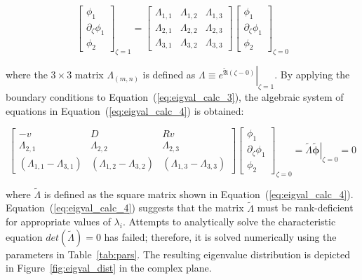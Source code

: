 \begin{equation} \label{eq:eigval_calc_3}
    \begin{bmatrix}
        \phi_1 \\ \partial_\zeta \phi_1 \\ \phi_2
    \end{bmatrix}_{\zeta=1} = \begin{bmatrix}
        \Lambda_{1,1} & \Lambda_{1,2} & \Lambda_{1,3} \\
        \Lambda_{2,1} & \Lambda_{2,2} & \Lambda_{2,3} \\
        \Lambda_{3,1} & \Lambda_{3,2} & \Lambda_{3,3}
    \end{bmatrix} \begin{bmatrix}
        \phi_1 \\ \partial_\zeta \phi_1 \\ \phi_2
    \end{bmatrix}_{\zeta=0}
\end{equation}

where the $ 3 \times 3$ matrix $\Lambda_{(m,n)}$ is defined as $\Lambda \equiv \left. e^{\tilde{\mathfrak{A}} (\zeta - 0)} \right|_{\zeta = 1}$. By applying the boundary conditions to Equation~(\ref{eq:eigval_calc_3}), the algebraic system of equations in Equation~(\ref{eq:eigval_calc_4}) is obtained:

\begin{equation} \label{eq:eigval_calc_4}
    \begin{bmatrix}
        -v & D & Rv \\
        \Lambda_{2,1} & \Lambda_{2,2} & \Lambda_{2,3} \\
        (\Lambda_{1,1} - \Lambda_{3,1}) & (\Lambda_{1,2} - \Lambda_{3,2}) & (\Lambda_{1,3} - \Lambda_{3,3})
    \end{bmatrix} \begin{bmatrix}
        \phi_1 \\ \partial_\zeta \phi_1 \\ \phi_2
    \end{bmatrix}_{\zeta=0} = \tilde{\Lambda} \left. \tilde{\bm{\phi}} \right|_{\zeta = 0} = 0
\end{equation}

where $\tilde{\Lambda}$ is defined as the square matrix shown in Equation~(\ref{eq:eigval_calc_4}). Equation~(\ref{eq:eigval_calc_4}) suggests that the matrix $\tilde{\Lambda}$ must be rank-deficient for appropriate values of $\lambda_i$. Attempts to analytically solve the characteristic equation $det(\tilde{\Lambda}) = 0$ has failed; therefore, it is solved numerically using the parameters in Table~\ref{tab:pars}. The resulting eigenvalue distribution is depicted in Figure~\ref{fig:eigval_dist} in the complex plane. 


